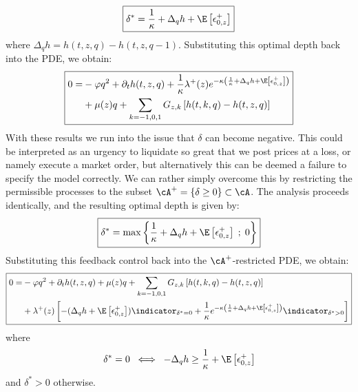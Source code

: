 \documentclass[12pt]{article}
\begin{document}
\begin{equation}\label{eq:ch12depth}
\boxed{\delta^{*} = \dfrac{1}{\kappa} + \Delta_q h + \E \left[ \epsilon^+_{0,z} \right]}
\end{equation}
where $\Delta_q h = h(t,z,q) - h(t,z,q-1)$. Substituting this optimal depth back into the PDE, we obtain: 
\begin{equation}
\label{eq:ch12PDEfinal}
\boxed{
\begin{split}
0 = & - \varphi q^2 + \partial_t h(t,z,q) + \dfrac{1}{\kappa} \lambda^+(z) e^{ -\kappa \left( \frac{1}{\kappa} + \Delta_q h + \E \left[ \epsilon^+_{0,z} \right] \right) } \\
 & + \mu(z) q + \sum_{k=-1,0,1} G_{z,k} \left[ h(t,k,q) - h(t,z,q) \right]
\end{split}
}
\end{equation}
With these results we run into the issue that $\delta$ can become negative. This could be interpreted as an urgency to liquidate so great that we post prices at a loss, or namely execute a market order, but alternatively this can be deemed a failure to specify the model correctly. We can rather simply overcome this by restricting the permissible processes to the subset $\cA^+ = \{ \delta \geq 0 \} \subset \cA$. The analysis proceeds identically, and the resulting optimal depth is given by:
\begin{equation}\label{eq:ch12depthpositive}
\boxed{\delta^{*} = \max \left\lbrace \dfrac{1}{\kappa} + \Delta_q h + \E \left[ \epsilon^+_{0,z} \right] \; ; \; 0 \right\rbrace }
\end{equation}
Substituting this feedback control back into the $\cA^+$-restricted PDE, we obtain:
\begin{equation}
\label{eq:ch12PDEfinalpositive}
\boxed{
\begin{split}
0 = & - \varphi q^2 + \partial_t h(t,z,q) + \mu(z) q + \sum_{k=-1,0,1} G_{z,k} \left[ h(t,k,q) - h(t,z,q) \right] \\
 & + \lambda^+(z) \left[-(\Delta_q h + \E \left[ \epsilon^+_{0,z} \right]) \indicator_{\delta^*=0} + \frac{1}{\kappa} e^{ -\kappa \left( \frac{1}{\kappa} + \Delta_q h + \E \left[ \epsilon^+_{0,z} \right] \right) } \indicator_{\delta^*>0} \right]
\end{split}
}
\end{equation}
where 
\[\delta^*=0 \; \iff \; -\Delta_q h \geq \frac{1}{\kappa} + \E \left[ \epsilon^+_{0,z} \right]\]
and $\delta^*>0$ otherwise.
\end{document}
